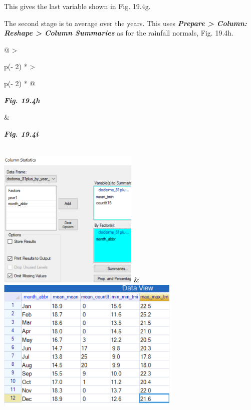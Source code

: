 \documentclass[
  letterpaper,
  DIV=11,
  numbers=noendperiod]{scrreprt}
\begin{document}
This gives the last variable shown in Fig. 19.4g.

The second stage is to average over the years. This uses
\textbf{\emph{Prepare \textgreater{} Column: Reshape \textgreater{}
Column Summaries}} as for the rainfall normals, Fig. 19.4h.

\begin{longtable}[]{@{}
  >{\raggedright\arraybackslash}p{(\columnwidth - 2\tabcolsep) * }
  >{\raggedright\arraybackslash}p{(\columnwidth - 2\tabcolsep) * }@{}}
\toprule\noalign{}
\begin{minipage}[b]{\linewidth}\raggedright
\textbf{\emph{Fig. 19.4h}}
\end{minipage} & \begin{minipage}[b]{\linewidth}\raggedright
\textbf{\emph{Fig. 19.4i}}
\end{minipage} \\
\midrule\noalign{}
\endhead
\bottomrule\noalign{}
\endlastfoot
\includegraphics[width=2.64831in,height=2.63875in]{figures/Fig19.4h.png}
&
\includegraphics[width=3.44252in,height=2.52764in]{figures/Fig19.4i.png} \\
\end{longtable}
\end{document}

